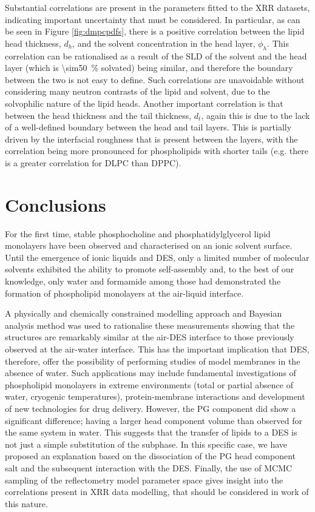 \documentclass[amsmath,amssymb,twocolumn,superscriptaddress]{revtex4-1}
\begin{document}
Substantial correlations are present in the parameters fitted to the XRR datasets, indicating important uncertainty that must be considered.
In particular, as can be seen in Figure \ref{fig:dmpcpdfs}, there is a positive correlation between the lipid head thickness, $d_h$, and the solvent concentration in the head layer, $\phi_h$.
This correlation can be rationalised as a result of the SLD of the solvent and the head layer (which is \SI{\sim50}{\percent} solvated) being similar, and therefore the boundary between the two is not easy to define.
Such correlations are unavoidable without considering many neutron contrasts of the lipid and solvent, due to the solvophilic nature of the lipid heads.
Another important correlation is that between the head thickness and the tail thickness, $d_t$, again this is due to the lack of a well-defined boundary between the head and tail layers.
This is partially driven by the interfacial roughness that is present between the layers, with the correlation being more pronounced for phospholipids with shorter tails (e.g. there is a greater correlation for DLPC than DPPC).

\section{Conclusions}
%
For the first time, stable phosphocholine and phosphatidylglycerol lipid monolayers have been observed and characterised on an ionic solvent surface.
Until the emergence of ionic liquids and DES, only a limited number of molecular solvents exhibited the ability to promote self-assembly and, to the best of our knowledge, only water and formamide among those had demonstrated the formation of phospholipid monolayers at the air-liquid interface.

A physically and chemically constrained modelling approach and Bayesian analysis method was used to rationalise these measurements showing that the structures are remarkably similar at the air-DES interface to those previously observed at the air-water interface.
This has the important implication that DES, therefore, offer the possibility of performing studies of model membranes in the absence of water.
Such applications may include fundamental investigations of phospholipid monolayers in extreme environments (total or partial absence of water, cryogenic temperatures), protein-membrane interactions and development of new technologies for drug delivery.
However, the PG component did show a significant difference; having a larger head component volume than observed for the same system in water.
This suggests that the transfer of lipids to a DES is not just a simple substitution of the subphase.
In this specific case, we have proposed an explanation based on the dissociation of the PG head component salt and the subsequent interaction with the DES.
Finally, the use of MCMC sampling of the reflectometry model parameter space gives insight into the correlations present in XRR data modelling, that should be considered in work of this nature.
\end{document}
